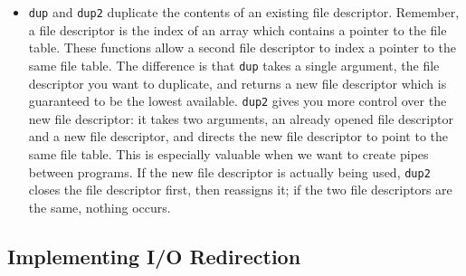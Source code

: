 \documentclass[]{article}
\begin{document}
\begin{itemize}
\item
  \texttt{dup} and \texttt{dup2} duplicate the contents of an existing
  file descriptor. Remember, a file descriptor is the index of an array
  which contains a pointer to the file table. These functions allow a
  second file descriptor to index a pointer to the same file table. The
  difference is that \texttt{dup} takes a single argument, the file
  descriptor you want to duplicate, and returns a new file descriptor
  which is guaranteed to be the lowest available. \texttt{dup2} gives
  you more control over the new file descriptor: it takes two arguments,
  an already opened file descriptor and a new file descriptor, and
  directs the new file descriptor to point to the same file table. This
  is especially valuable when we want to create pipes between programs.
  If the new file descriptor is actually being used, \texttt{dup2}
  closes the file descriptor first, then reassigns it; if the two file
  descriptors are the same, nothing occurs.
\end{itemize}

\subsection{\texorpdfstring{\textbf{Implementing I/O
Redirection}}{Implementing I/O Redirection}}\label{header-n431}
\end{document}
